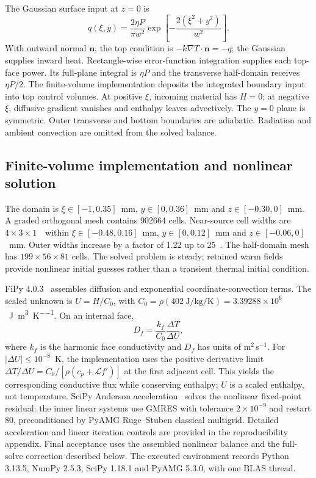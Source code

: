 The Gaussian surface input at $z=0$ is
\begin{equation}
 q(\xi,y)=\frac{2\eta P}{\pi w^2}
 \exp\!\left[-\frac{2(\xi^2+y^2)}{w^2}\right].
 \label{eq:source}
\end{equation}
With outward normal $\bm n$, the top condition is $-k\nabla T\cdot\bm n=-q$; the Gaussian supplies inward heat. Rectangle-wise error-function integration supplies each top-face power. Its full-plane integral is $\eta P$ and the transverse half-domain receives $\eta P/2$. The finite-volume implementation deposits the integrated boundary input into top control volumes. At positive $\xi$, incoming material has $H=0$; at negative $\xi$, diffusive gradient vanishes and enthalpy leaves advectively. The $y=0$ plane is symmetric. Outer transverse and bottom boundaries are adiabatic. Radiation and ambient convection are omitted from the solved balance.

\subsection{Finite-volume implementation and nonlinear solution}
The domain is $\xi\in[-1,0.35]$~mm, $y\in[0,0.36]$~mm and $z\in[-0.30,0]$~mm. A graded orthogonal mesh contains 902664 cells. Near-source cell widths are $4\times3\times1$~\um\ within $\xi\in[-0.48,0.16]$~mm, $y\in[0,0.12]$~mm and $z\in[-0.06,0]$~mm. Outer widths increase by a factor of 1.22 up to 25~\um. The half-domain mesh has $199\times56\times81$ cells. The solved problem is steady; retained warm fields provide nonlinear initial guesses rather than a transient thermal initial condition.

FiPy 4.0.3~\cite{fipy2009} assembles diffusion and exponential coordinate-convection terms. The scaled unknown is $U=H/C_0$, with $C_0=\rho(402~\si{\joule\per\kilogram\per\kelvin})=3.39288\times10^6$~\si{\joule\per\cubic\metre\per\kelvin}. On an internal face,
\begin{equation}
 D_f=\frac{k_f}{C_0}\frac{\Delta T}{\Delta U},
 \label{eq:face}
\end{equation}
where $k_f$ is the harmonic face conductivity and $D_f$ has units of m$^2$\,s$^{-1}$. For $|\Delta U|\leq10^{-8}$~K, the implementation uses the positive derivative limit $\Delta T/\Delta U=C_0/[\rho(c_p+\mathcal L f')]$ at the first adjacent cell. This yields the corresponding conductive flux while conserving enthalpy; $U$ is a scaled enthalpy, not temperature. SciPy Anderson acceleration~\cite{scipy2020} solves the nonlinear fixed-point residual; the inner linear systems use GMRES with tolerance $2\times10^{-9}$ and restart 80, preconditioned by PyAMG Ruge--Stuben classical multigrid. Detailed acceleration and linear iteration controls are provided in the reproducibility appendix. Final acceptance uses the assembled nonlinear balance and the full-solve correction described below. The executed environment records Python 3.13.5, NumPy 2.5.3, SciPy 1.18.1 and PyAMG 5.3.0, with one BLAS thread.

